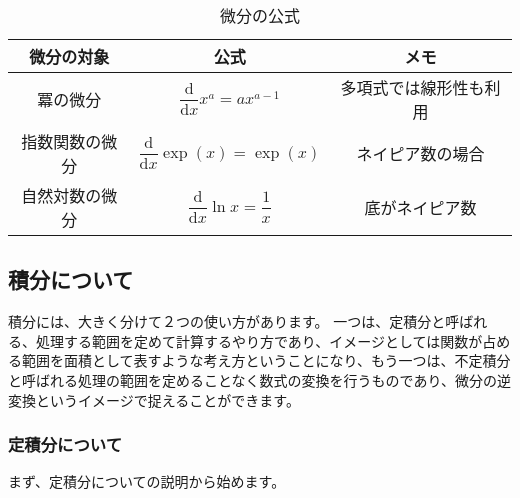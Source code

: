 \documentclass[uplatex,dvipdfmx,a4paper,11pt]{jsarticle}
\begin{document}
\renewcommand{\arraystretch}{2}
\begin{table}[tb]
	\begin{center}
		\caption{微分の公式}
		\label{bibun_kousiki}
			\begin{tabular}{|c|c|c|} \hline
				微分の対象		& 公式							& メモ \\ \hline \hline
				冪の微分		& $\dfrac{\mathrm{d}}{\mathrm{d}x}x^a = ax^{a-1}$ 		&  多項式では線形性も利用\\ \hline
				指数関数の微分	& $\dfrac{\mathrm{d}}{\mathrm{d}x}\exp(x) = \exp(x)$ 		&  ネイピア数の場合\\ \hline
				自然対数の微分	& $\dfrac{\mathrm{d}}{\mathrm{d}x}\ln x = \dfrac{1}{x}$ 	& 底がネイピア数 \\ \hline
			\end{tabular}
		\end{center}
\end{table}
\renewcommand{\arraystretch}{1.}

\subsection{積分について}
積分には、大きく分けて２つの使い方があります。
一つは、定積分と呼ばれる、処理する範囲を定めて計算するやり方であり、イメージとしては関数が占める範囲を面積として表すような考え方ということになり、もう一つは、不定積分と呼ばれる処理の範囲を定めることなく数式の変換を行うものであり、微分の逆変換というイメージで捉えることができます。

\subsubsection{定積分について}
まず、定積分についての説明から始めます。
\end{document}
